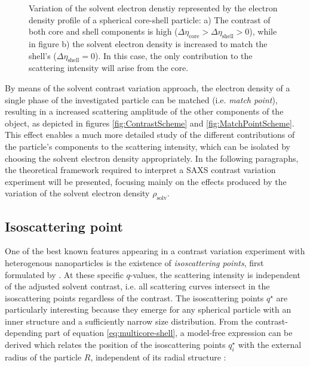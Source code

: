 \begin{figure}%
	\centering
	\caption[Solvent contrast variation experiment and contrast matching scheme]{Variation of the solvent electron denstiy represented by the electron density profile of a spherical core-shell particle: a) The contrast of both core and shell components is high ($\Delta\eta_{\text{core}} > \Delta\eta_{\text{shell}} > 0$), while in figure b) the solvent electron density is increased to match the shell's ($\Delta\eta_{\text{shell}} = 0$). In this case, the only contribution to the scattering intensity will arise from the core.}
\end{figure}


By means of the solvent contrast variation approach, the electron density of a single phase of the investigated particle can be matched (i.e. \emph{match point}), resulting in a increased scattering amplitude of the other components of the object, as depicted in figures \ref{fig:ContrastScheme} and \ref{fig:MatchPointScheme}. This effect enables a much more detailed study of the different contributions of the particle's components to the scattering intensity, which can be isolated by choosing the solvent electron density appropriately. In the following paragraphs, the theoretical framework required to interpret a SAXS contrast variation experiment will be presented, focusing mainly on the effects produced by the variation of the solvent electron density $\rho_{\text{solv}}$.

 
\subsection{Isoscattering point}
\label{sec:isopoint_theory}
One of the best known features appearing in a contrast variation experiment with heterogenous nanoparticles is the existence of \emph{isoscattering points}, first formulated by \cite{kawaguchi_x-ray_1983-1}. At these specific \( q\)-values, the scattering intensity is independent of the adjusted solvent contrast, i.e. all scattering curves intersect in the isoscattering points regardless of the contrast. The isoscattering points \(q^{\star}\) are particularly interesting because they emerge for any spherical particle with an inner structure and a sufficiently narrow size distribution. From the contrast-depending part of equation \eqref{eq:multicore-shell}, a model-free expression can be derived which relates the position of the isoscattering points \(q^{\star}_i\) with the external radius of the particle \( R \), independent of its radial structure \citep{kawaguchi_x-ray_1983-1,kawaguchi_isoscattering_1992}:

